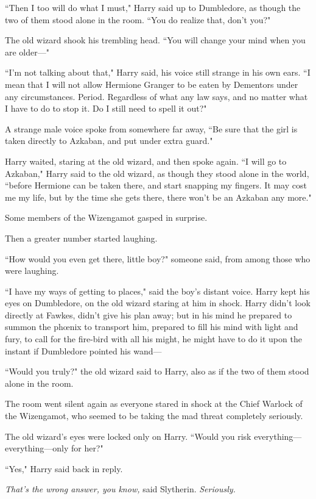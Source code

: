 ``Then I too will do what I must," Harry said up to Dumbledore, as though the two of them stood alone in the room. ``You do realize that, don't you?"

The old wizard shook his trembling head. ``You will change your mind when you are older—"

``I'm not talking about that," Harry said, his voice still strange in his own ears. ``I mean that I will not allow Hermione Granger to be eaten by Dementors under any circumstances. Period. Regardless of what any law says, and no matter what I have to do to stop it. Do I still need to spell it out?"

A strange male voice spoke from somewhere far away, ``Be sure that the girl is taken directly to Azkaban, and put under extra guard."

Harry waited, staring at the old wizard, and then spoke again. ``I will go to Azkaban," Harry said to the old wizard, as though they stood alone in the world, ``before Hermione can be taken there, and start snapping my fingers. It may cost me my life, but by the time she gets there, there won't be an Azkaban any more."

Some members of the Wizengamot gasped in surprise.

Then a greater number started laughing.

``How would you even get there, little boy?" someone said, from among those who were laughing.

``I have my ways of getting to places," said the boy's distant voice. Harry kept his eyes on Dumbledore, on the old wizard staring at him in shock. Harry didn't look directly at Fawkes, didn't give his plan away; but in his mind he prepared to summon the phœnix to transport him, prepared to fill his mind with light and fury, to call for the fire-bird with all his might, he might have to do it upon the instant if Dumbledore pointed his wand—

``Would you truly?" the old wizard said to Harry, also as if the two of them stood alone in the room.

The room went silent again as everyone stared in shock at the Chief Warlock of the Wizengamot, who seemed to be taking the mad threat completely seriously.

The old wizard's eyes were locked only on Harry. ``Would you risk everything—everything—only for her?"

``Yes," Harry said back in reply.

\emph{That's the wrong answer, you know,} said Slytherin. \emph{Seriously.}

